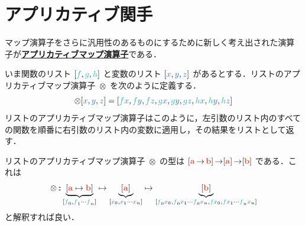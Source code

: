 \documentclass[a5paper,twoside,fleqn,draft]{jsbook}
\def\[{[\![}
\def\]{]\!]}
\def\varColor{NavyBlue}
\def\funcColor{BlueGreen}
\def\typeColor{RedOrange}
\newcommand{\programminglanguage}[1]{\textsf{#1}}
\newcommand{\haskell}{\programminglanguage{Haskell}}
\newcommand{\keyword}[1]{{\underline{\textbf{#1}}}}
\newcommand{\code}[1]{\texttt{#1}}
\newcommand{\mVar}[1]{\textcolor{\varColor}{#1}}
\newcommand{\mXVar}{\mVar{x}}
\newcommand{\mYVar}{\mVar{y}}
\newcommand{\mZVar}{\mVar{z}}
\newcommand{\mFunc}[1]{\textcolor{\funcColor}{#1}}
\newcommand{\mFFunc}{{\mFunc{f}}}
\newcommand{\mGFunc}{\mFunc{g}}
\newcommand{\mHFunc}{\mFunc{h}}
\DeclareMathOperator{\mAppMapList}{\otimes}
\DeclareMathOperator{\mFuncArrow}{\rightarrow}
\DeclareMathOperator{\mIn}{{:\!:}}
\DeclareMathOperator{\mMap}{\cdot}
\DeclareMathOperator{\mMapList}{\odot}
\DeclareMathOperator{\mMapMaybe}{\boxdot}
\newcommand{\mType}[1]{\textcolor{\typeColor}{\mathbf{#1}}}
\newcommand{\mA}{\mType{a}}
\newcommand{\mB}{\mType{b}}
\newcommand{\mTypeAssemble}[2]{{}^\mathrm{#1}\[\mType{#2}\]}
\newcommand{\mMaybeType}[1]{\mTypeAssemble{Maybe}{#1}}
\newcommand{\mTypeClass}[1]{\textcolor{\typeColor}{\textbf{\textit{#1}}}}
\newcommand{\mFunctorTypeClass}{\mTypeClass{Functor}}
\newcommand{\mList}[1]{\mVar{#1}_\mathrm{s}}
\newcommand{\mMaybe}[1]{\mVar{#1}_?}
\begin{document}




\section{アプリカティブ関手}

マップ演算子をさらに汎用性のあるものにするために新しく考え出された演算子が\keyword{アプリカティブマップ演算子}である．

いま関数のリスト $[\mFFunc,\mGFunc,\mHFunc]$ と変数のリスト $[\mXVar,\mYVar,\mZVar]$ があるとする．リストのアプリカティブマップ演算子 $\mAppMapList$ を次のように定義する．
\begin{equation}
  [\mFFunc,\mGFunc,\mHFunc]\mAppMapList[\mXVar,\mYVar,\mZVar]
  =[\mFFunc\mXVar,\mFFunc\mYVar,\mFFunc\mZVar,\mGFunc\mXVar,\mGFunc\mYVar,\mGFunc\mZVar,\mHFunc\mXVar,\mHFunc\mYVar,\mHFunc\mZVar]
\end{equation}
リストのアプリカティブマップ演算子はこのように，左引数のリスト内のすべての関数を順番に右引数のリスト内の変数に適用し，その結果をリストとして返す．

リストのアプリカティブマップ演算子 $\mAppMapList$ の型は
$[\mA\mFuncArrow\mB]\mFuncArrow[\mA]\mFuncArrow[\mB]$ である．これは
\begin{equation}
  \mAppMapList
  \mIn\underbrace{[\mA\mapsto\mB]}_{[\mFFunc_0,\mFFunc_1\dotsb \mFFunc_n]}
  \mapsto\underbrace{[\mA]}_{[\mXVar_0,\mXVar_1\dotsb \mXVar_n]}
  \mapsto\underbrace{[\mB]}_{[\mFFunc_0\mXVar_0,\mFFunc_0\mXVar_1\dotsb \mFFunc_0\mXVar_n,\mFFunc \mXVar_0,\mFFunc \mXVar_1\dotsb \mFFunc_n\mXVar_n]}
\end{equation}
と解釈すれば良い．
\end{document}
